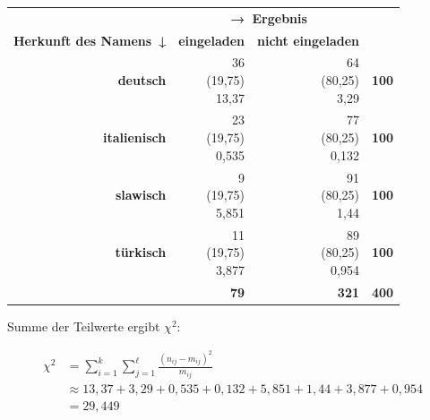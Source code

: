 \documentclass[
  11pt,
  ngerman,
  a4paper,
]{report}
\begin{document}
\begin{table}[H]
\centering
\begin{tabular}{>{}r|r>{}r|>{}r}
\toprule
\multicolumn{1}{c}{\textbf{ }} & \multicolumn{2}{c}{\textbf{→ Ergebnis}} & \multicolumn{1}{c}{\textbf{ }} \\
\cmidrule(l{3pt}r{3pt}){2-3}
\textbf{Herkunft des Namens ↓} & \textbf{eingeladen} & \textbf{nicht eingeladen} & \textbf{  }\\
\midrule
\textbf{deutsch} & \makecell[tr]{36\\(19,75)\\\textcolor{goethe_blue}{13,37}} & \makecell[tr]{64\\(80,25)\\\textcolor{goethe_blue}{3,29}} & \textbf{100}\\
\textbf{italienisch} & \makecell[tr]{23\\(19,75)\\\textcolor{goethe_blue}{0,535}} & \makecell[tr]{77\\(80,25)\\\textcolor{goethe_blue}{0,132}} & \textbf{100}\\
\textbf{slawisch} & \makecell[tr]{9\\(19,75)\\\textcolor{goethe_blue}{5,851}} & \makecell[tr]{91\\(80,25)\\\textcolor{goethe_blue}{1,44}} & \textbf{100}\\
\textbf{türkisch} & \makecell[tr]{11\\(19,75)\\\textcolor{goethe_blue}{3,877}} & \makecell[tr]{89\\(80,25)\\\textcolor{goethe_blue}{0,954}} & \textbf{100}\\
\midrule
\textbf{\textbf{}} & \textbf{79} & \textbf{321} & \textbf{\textbf{400}}\\
\bottomrule
\end{tabular}
\end{table}

Summe der Teilwerte ergibt \(\chi^2\):

\[
\begin{aligned}
\chi^2&= \sum_{i=1}^{k}\sum_{j=1}^{\ell}\frac{(n_{ij}-m_{ij})^{2}}{m_{ij}}\\[4pt]
      &\approx13{,}37+3{,}29+0{,}535+0{,}132+5{,}851+1{,}44+3{,}877+0{,}954\\
      &=29{,}449
\end{aligned}
\]
\end{document}
